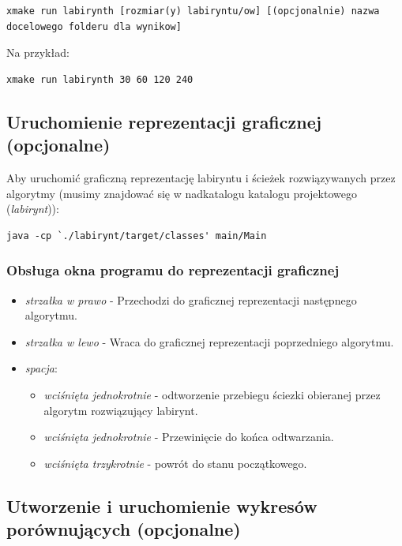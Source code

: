 \documentclass{article}
\begin{document}
\begin{lstlisting}
xmake run labirynth [rozmiar(y) labiryntu/ow] [(opcjonalnie) nazwa docelowego folderu dla wynikow]
\end{lstlisting}

Na przykład:

\begin{lstlisting}
xmake run labirynth 30 60 120 240
\end{lstlisting}

\subsection{Uruchomienie reprezentacji graficznej (opcjonalne)}

Aby uruchomić graficzną reprezentację labiryntu i ścieżek rozwiązywanych przez algorytmy (musimy znajdować się w nadkatalogu katalogu projektowego (\textit{labirynt})):

\begin{lstlisting}
java -cp `./labirynt/target/classes' main/Main
\end{lstlisting}

\subsubsection{Obsługa okna programu do reprezentacji graficznej}

\begin{itemize}
        \item \textit{strzałka w prawo} - Przechodzi do graficznej reprezentacji następnego algorytmu.
        \item \textit{strzałka w lewo} - Wraca do graficznej reprezentacji poprzedniego algorytmu.
        \item \textit{spacja}: 
        \begin{itemize}
        	\item \textit{wciśnięta jednokrotnie} - odtworzenie przebiegu ściezki obieranej przez algorytm rozwiązujący labirynt.
        	\item \textit{wciśnięta jednokrotnie} - Przewinięcie do końca odtwarzania.
        	\item \textit{wciśnięta trzykrotnie} - powrót do stanu początkowego.
        \end{itemize}
\end{itemize}

\subsection{Utworzenie i uruchomienie wykresów porównujących (opcjonalne)}
\end{document}
